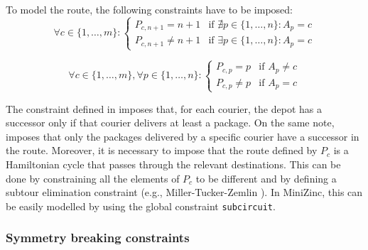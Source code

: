 To model the route, the following constraints have to be imposed:
\begin{equation}
    \label{eq:cp_constr_route_depot}
    \forall c \in \{ 1, \dots, m \}: 
    \begin{cases}
        P_{c, n+1} = n+1    & \text{if $\nexists p \in \{ 1, \dots, n \}: A_p = c$} \\ 
        P_{c, n+1} \neq n+1 & \text{if $\exists p \in \{ 1, \dots, n \}: A_p = c$} 
    \end{cases}
\end{equation}

\begin{equation}
    \label{eq:cp_constr_route_packs}
    \forall c \in \{ 1, \dots, m \},
    \forall p \in \{ 1, \dots, n \}: 
    \begin{cases}
        P_{c, p} = p    & \text{if $A_p \neq c$} \\
        P_{c, p} \neq p & \text{if $A_p = c$} 
    \end{cases}
\end{equation}

The constraint defined in  imposes that, for each courier, the depot has a successor only if that courier delivers at least a package. On the same note,  imposes that only the packages delivered by a specific courier have a successor in the route.
Moreover, it is necessary to impose that the route defined by $P_c$ is a Hamiltonian cycle that passes through the relevant destinations. This can be done by constraining all the elements of $P_c$ to be different and by defining a subtour elimination constraint (e.g., Miller-Tucker-Zemlin \cite{mtz_subtour}). In MiniZinc, this can be easily modelled by using the global constraint \texttt{subcircuit}.


\subsubsection{Symmetry breaking constraints}

